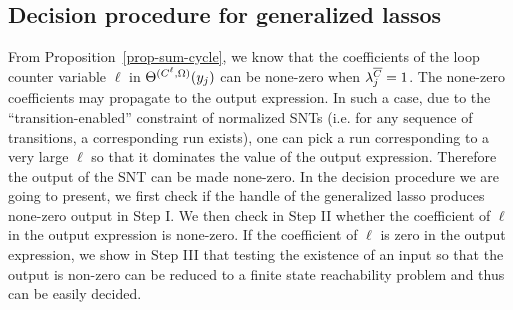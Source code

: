 %
%
%
%

\vspace{-0.5cm}
\subsection{Decision procedure for generalized lassos}\label{sec-glasso}
\vspace{-1mm}
%
From Proposition~\ref{prop-sum-cycle}, we know that the coefficients of the loop counter variable $\ell$ in $\Theta^{(C^\ell,\Omega)}(y_j)$ can be none-zero when $\lambda^{\overline{C}}_{j}=1$. The none-zero coefficients may propagate to the output expression.  In such a case, due to the ``transition-enabled'' constraint of normalized SNTs (i.e. for any sequence of transitions, a corresponding run exists), one can pick a run corresponding to a very large $\ell$ so that it dominates the value of the output expression. Therefore the output of the SNT can be made none-zero. 
In the decision procedure we are going to present, we first check if the handle of the generalized lasso produces none-zero output in Step I.
We then check in Step II whether the coefficient of $\ell$ in the output expression is none-zero. If the coefficient of $\ell$ is zero in the output expression, we show in Step III that testing the existence of an input so that the output is non-zero can be reduced to a finite state reachability problem and thus can be easily decided.

